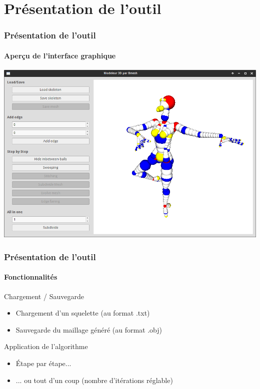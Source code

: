 \documentclass[10pt]{beamer}
\begin{document}
\section{Présentation de l'outil}

\begin{frame}
	\frametitle{Présentation de l'outil}
	\framesubtitle{Aperçu de l'interface graphique}
	\begin{center}
		\includegraphics[scale=0.27]{images/screenshot.png}
	\end{center}
\end{frame}

\begin{frame}
	\frametitle{Présentation de l'outil}
	\framesubtitle{Fonctionnalités}
	\begin{block}{Chargement / Sauvegarde}
		\begin{itemize}
			\item Chargement d'un squelette (au format .txt)
			\item Sauvegarde du maillage généré (au format .obj)
		\end{itemize}				
	\end{block}
	\begin{block}{Application de l'algorithme}
		\begin{itemize}
			\item Étape par étape...
			\item ... ou tout d'un coup (nombre d'itérations réglable)
		\end{itemize}
	\end{block}
\end{frame}
\end{document}
